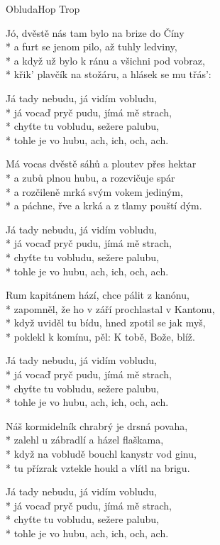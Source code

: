 \documentclass[10.5pt]{book}
\begin{document}
\begin{poem}{Obluda}{Hop Trop}

\settowidth{\versewidth}{křik' plavčík na stožáru, a hlásek se mu třás'}

Jó, dvěstě nás tam bylo na brize do Číny\\*
a furt se jenom pilo, až tuhly ledviny,\\*
a když už bylo k ránu a všichni pod vobraz,\\*
křik' plavčík na stožáru, a hlásek se mu třás':

Já tady nebudu, já vidím vobludu,\\*
já vocaď pryč pudu, jímá mě strach,\\*
chyťte tu vobludu, sežere palubu,\\*
tohle je vo hubu, ach, ich, och, ach.

Má vocas dvěstě sáhů a ploutev přes hektar\\*
a zubů plnou hubu, a rozcvičuje spár\\*
a rozčileně mrká svým vokem jediným,\\*
a páchne, řve a krká a z tlamy pouští dým.

Já tady nebudu, já vidím vobludu,\\*
já vocaď pryč pudu, jímá mě strach,\\*
chyťte tu vobludu, sežere palubu,\\*
tohle je vo hubu, ach, ich, och, ach.

Rum kapitánem hází, chce pálit z kanónu,\\*
zapomněl, že ho v září prochlastal v Kantonu,\\*
když uviděl tu bídu, hned zpotil se jak myš,\\*
poklekl k komínu, pěl: K tobě, Bože, blíž.

Já tady nebudu, já vidím vobludu,\\*
já vocaď pryč pudu, jímá mě strach,\\*
chyťte tu vobludu, sežere palubu,\\*
tohle je vo hubu, ach, ich, och, ach.

Náš kormidelník chrabrý je drsná povaha,\\*
zalehl u zábradlí a házel flaškama,\\*
když na vobludě bouchl kanystr vod ginu,\\*
tu přízrak vztekle houkl a vlítl na brigu.

Já tady nebudu, já vidím vobludu,\\*
já vocaď pryč pudu, jímá mě strach,\\*
chyťte tu vobludu, sežere palubu,\\*
tohle je vo hubu, ach, ich, och, ach.


\end{poem}
\end{document}
